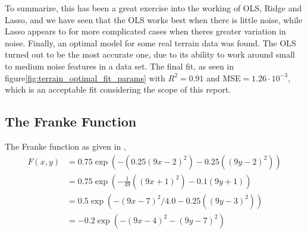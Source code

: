 \documentclass[11pt]{article}
\begin{document}
To summarize, this has been a great exercise into the working of OLS, Ridge and Lasso, and we have seen that the OLS works best when there is little noise, while Lasso appears to for more complicated cases when theres greater variation in noise. Finally, an optimal model for some real terrain data was found. The OLS turned out to be the most accurate one, due to its ability to work around small to medium noise features in a data set. The final fit, as seen in figure\ref{fig:terrain_optimal_fit_params} with $R^2=0.91$ and MSE$=1.26\cdot 10^{-3}$, which is an acceptable fit considering the scope of this report.

\begin{appendices}
\subsection{The Franke Function} \label{sec:appendix}
The Franke function as given in \cite{franke1979critical},
\begin{align}
    F(x,y) &= 0.75\exp\left(-\left(0.25\left(9x-2\right)^2\right) - 0.25\left(\left(9y-2\right)^2\right)\right) \\
    &= 0.75\exp\left(-\frac{1}{49}\left(\left(9x+1\right)^2\right) - 0.1\left(9y+1\right)\right) \\
    &= 0.5\exp\left(-\left(9x-7\right)^2/4.0 - 0.25\left(\left(9y-3\right)^2\right)\right) \\
    &= -0.2\exp\left(-\left(9x-4\right)^2 - \left(9y-7\right)^2\right)
    \label{eq:franke_function}
\end{align}
\end{appendices}



\end{document}
